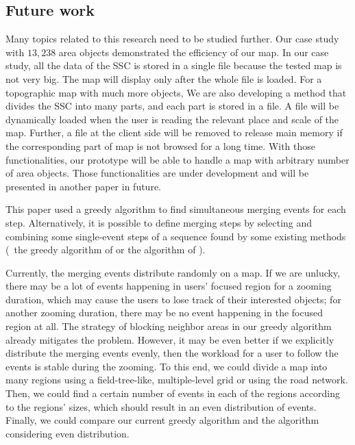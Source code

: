 \documentclass[twocolumn]{svjour3}          %
\begin{document}
\subsection{Future work}

Many topics related to this research need to be studied further.
Our case study with $13{,}238$ area objects 
demonstrated the efficiency of our map.
In our case study, all the data of the SSC is stored in a single file
because the tested map is not very big.
The map will display only after the whole file is loaded.
For a topographic map with much more objects,
We are also developing a method that divides the SSC into many parts, 
and each part is stored in a file.
A file will be dynamically loaded when the user is reading the relevant place and scale of the map.
Further, a file at the client side will be removed to release main memory
if the corresponding part of map is not browsed for a long time. 
With those functionalities, our prototype will be able to handle 
a map with arbitrary number of area objects.
Those functionalities are under development 
and will be presented in another paper in future.






This paper used a greedy algorithm 
to find simultaneous merging events for each step.
Alternatively, it is possible to define merging steps 
by selecting and combining some single-event steps of a sequence found 
by some existing methods
(\eg~the greedy algorithm of \citet{vanOosterom2005}
or the \Astar algorithm of \citet{Peng2020AreaAgg}).

Currently, the merging events distribute randomly on a map.
If we are unlucky, there may be a lot of events 
happening in users' focused region for a zooming duration,
which may cause the users to lose track of their interested objects;
for another zooming duration, 
there may be no event happening in the focused region at all.
The strategy of blocking neighbor areas in our greedy algorithm 
already mitigates the problem.
However, it may be even better if 
we explicitly distribute the merging events evenly, 
then the workload for a user to follow the events is stable during the zooming.
To this end, we could divide a map into many regions 
using a field-tree-like, multiple-level grid \citep{vanPutten1998NewGAP}
or using the road network.
Then, we could find a certain number of events in each of the regions 
according to the regions' sizes,
which should result in an even distribution of events.
Finally, we could compare our current greedy algorithm and 
the algorithm considering even distribution.
\end{document}

